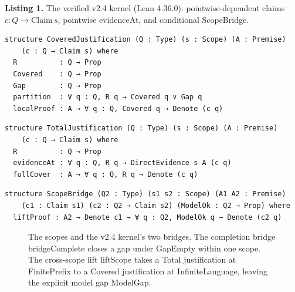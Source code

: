 \documentclass[11pt,a4paper]{article}
\begin{document}
\textbf{Listing 1.} The verified v2.4 kernel (Lean 4.36.0): pointwise-dependent claims \(c:Q\to\mathrm{Claim}\,s\), pointwise evidenceAt, and conditional ScopeBridge.

\begin{Verbatim}[fontsize=\small]
structure CoveredJustification (Q : Type) (s : Scope) (A : Premise)
    (c : Q → Claim s) where
  R          : Q → Prop
  Covered    : Q → Prop
  Gap        : Q → Prop
  partition  : ∀ q : Q, R q → Covered q ∨ Gap q
  localProof : A → ∀ q : Q, Covered q → Denote (c q)

\end{Verbatim}
\begin{Verbatim}[fontsize=\small]
structure TotalJustification (Q : Type) (s : Scope) (A : Premise)
    (c : Q → Claim s) where
  R          : Q → Prop
  evidenceAt : ∀ q : Q, R q → DirectEvidence s A (c q)
  fullCover  : A → ∀ q : Q, R q → Denote (c q)

\end{Verbatim}
\begin{Verbatim}[fontsize=\small]
structure ScopeBridge (Q2 : Type) (s1 s2 : Scope) (A1 A2 : Premise)
    (c1 : Claim s1) (c2 : Q2 → Claim s2) (ModelOk : Q2 → Prop) where
  liftProof : A2 → Denote c1 → ∀ q : Q2, ModelOk q → Denote (c2 q)

\end{Verbatim}
\begin{figure}[htbp]
\centering
{}
\caption{The scopes and the v2.4 kernel's two bridges. The completion bridge bridgeComplete closes a gap under GapEmpty within one scope. The cross-scope lift liftScope takes a Total justification at FinitePrefix to a Covered justification at InfiniteLanguage, leaving the explicit model gap ModelGap.}
\end{figure}
\end{document}
